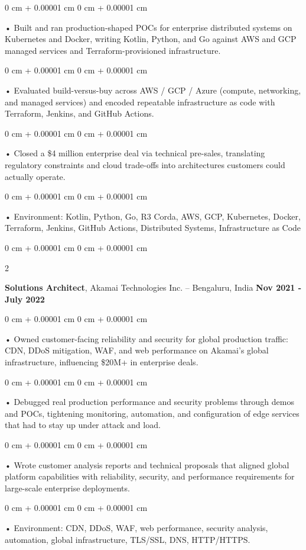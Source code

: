 \documentclass[10pt, letterpaper]{article}
\newenvironment{onecolentry}{
    \begin{adjustwidth}{
        0 cm + 0.00001 cm
    }{
        0 cm + 0.00001 cm
    }
}{
    \end{adjustwidth}
} %
\newenvironment{twocolentry}[2][]{
    \onecolentry
    \def\secondColumn{#2}
    \setcolumnwidth{\fill, 4.5 cm}
    \begin{paracol}{2}
}{
    \switchcolumn \raggedleft \secondColumn
    \end{paracol}
    \endonecolentry
} %
\begin{document}
        \begin{onecolentry}
             • Built and ran production-shaped POCs for enterprise distributed systems on Kubernetes and Docker, writing Kotlin, Python, and Go against AWS and GCP managed services and Terraform-provisioned infrastructure.
        \end{onecolentry}
        \begin{onecolentry}
             • Evaluated build-versus-buy across AWS / GCP / Azure (compute, networking, and managed services) and encoded repeatable infrastructure as code with Terraform, Jenkins, and GitHub Actions.
        \end{onecolentry}
        \begin{onecolentry}
             • Closed a \$4 million enterprise deal via technical pre-sales, translating regulatory constraints and cloud trade-offs into architectures customers could actually operate.
        \end{onecolentry}
        \begin{onecolentry}
             • Environment: Kotlin, Python, Go, R3 Corda, AWS, GCP, Kubernetes, Docker, Terraform, Jenkins, GitHub Actions, Distributed Systems, Infrastructure as Code
        \end{onecolentry}
        \vspace{0.1cm}

        \begin{twocolentry}{
            \textbf{Nov 2021 - July 2022}
        }
            \textbf{Solutions Architect}, Akamai Technologies Inc. -- Bengaluru, India \end{twocolentry}
        \begin{onecolentry}
            • Owned customer-facing reliability and security for global production traffic: CDN, DDoS mitigation, WAF, and web performance on Akamai's global infrastructure, influencing \$20M+ in enterprise deals.
        \end{onecolentry}
        \begin{onecolentry}
            • Debugged real production performance and security problems through demos and POCs, tightening monitoring, automation, and configuration of edge services that had to stay up under attack and load.
        \end{onecolentry}
        \begin{onecolentry}
             • Wrote customer analysis reports and technical proposals that aligned global platform capabilities with reliability, security, and performance requirements for large-scale enterprise deployments.
        \end{onecolentry}
        \begin{onecolentry}
             • Environment: CDN, DDoS, WAF, web performance, security analysis, automation, global infrastructure, TLS/SSL, DNS, HTTP/HTTPS.
        \end{onecolentry}
\end{document}
